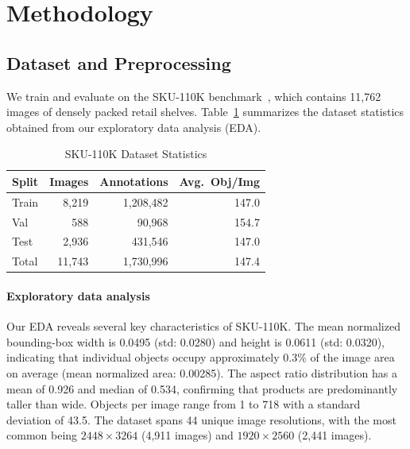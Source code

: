 \documentclass[conference]{IEEEtran}
\begin{document}
\section{Methodology}
\label{sec:method}

\subsection{Dataset and Preprocessing}
\label{sec:dataset}

We train and evaluate on the SKU-110K
benchmark~\cite{goldman2019dense}, which contains 11,762 images of densely
packed retail shelves. Table~\ref{tab:dataset} summarizes the dataset
statistics obtained from our exploratory data analysis (EDA).

\begin{table}[t]
  \centering
  \caption{SKU-110K Dataset Statistics}
  \label{tab:dataset}
  \begin{tabular}{@{}lrrr@{}}
    \toprule
    Split & Images & Annotations & Avg.\ Obj/Img \\
    \midrule
    Train  & 8,219  & 1,208,482 & 147.0 \\
    Val    & 588    & 90,968    & 154.7 \\
    Test   & 2,936  & 431,546   & 147.0 \\
    \midrule
    Total  & 11,743 & 1,730,996 & 147.4 \\
    \bottomrule
  \end{tabular}
\end{table}

\paragraph{Exploratory data analysis}
Our EDA reveals several key characteristics of SKU-110K. The mean
normalized bounding-box width is 0.0495 (std: 0.0280) and height is
0.0611 (std: 0.0320), indicating that individual objects occupy
approximately 0.3\% of the image area on average (mean normalized area:
0.00285). The aspect ratio distribution has a mean of 0.926 and median
of 0.534, confirming that products are predominantly taller than wide.
Objects per image range from 1 to 718 with a standard deviation of 43.5.
The dataset spans 44 unique image resolutions, with the most common being
$2448 \times 3264$ (4,911 images) and $1920 \times 2560$ (2,441 images).
\end{document}
